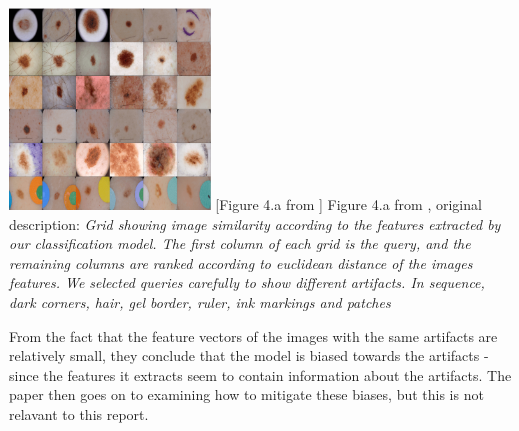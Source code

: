 \begin{center}
    \includegraphics[width=0.4\textwidth]{images/not-so-fast-artifact-query.png}
    [Figure 4.a from \cite{debias-not-so-fast}]{
            Figure 4.a from \cite{debias-not-so-fast}, original description: \textit{Grid showing image similarity according to the features extracted by our classification model. The first column
            of each grid is the query, and the remaining columns are ranked according to euclidean distance of the images features.
            We selected queries carefully to show different artifacts.
            In sequence, dark corners, hair, gel border, ruler, ink markings and patches}}
    \label{fig:not-so-fast-artifact-query}
\end{center}

From the fact that the feature vectors of the images with the same artifacts are relatively small,
they conclude that the model is biased towards the artifacts - since the features it extracts seem to contain information about the artifacts.
The paper then goes on to examining how to mitigate these biases, but this is not relavant to this report.